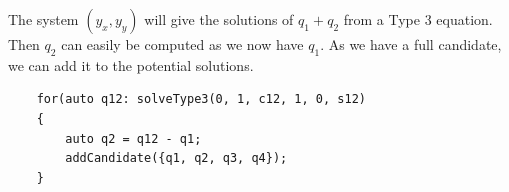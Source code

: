 \documentclass{ecnreport}
\begin{document}
The system $(y_x, y_y)$ will give the solutions of $q_1+q_2$ from a Type 3 equation. Then $q_2$ can easily be computed as we now have $q_1$. As we have a full candidate, we can add it to the potential solutions.

    \begin{center}
    \cppstyle \raggedright
    \begin{lstlisting}
    for(auto q12: solveType3(0, 1, c12, 1, 0, s12)
    {
        auto q2 = q12 - q1;
        addCandidate({q1, q2, q3, q4});
    }
    \end{lstlisting}
\end{center}
\end{document}
